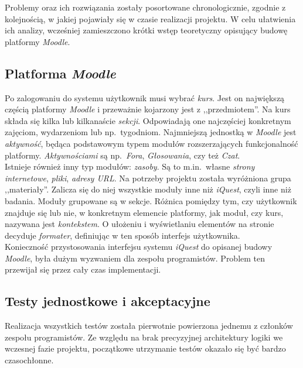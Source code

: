 Problemy oraz ich rozwiązania zostały posortowane chronologicznie, zgodnie z kolejnością, w jakiej pojawiały się w czasie realizacji projektu. W celu ułatwienia ich analizy, wcześniej zamieszczono krótki wstęp teoretyczny opisujący budowę platformy \textit{Moodle}.

\subsection{Platforma \textit{Moodle}}
\label{Chapter622}

Po zalogowaniu do systemu użytkownik musi wybrać \textit{kurs}. Jest on największą częścią platformy \textit{Moodle} i przeważnie kojarzony jest z ,,przedmiotem''. Na kurs składa się kilka lub kilkanaście \textit{sekcji}. Odpowiadają one najczęściej konkretnym zajęciom, wydarzeniom lub np.~tygodniom. Najmniejszą jednostką w \textit{Moodle} jest \textit{aktywność}, będąca podstawowym typem modułów rozszerzających funkcjonalność platformy. \textit{Aktywnościami} są np.~\textit{Fora}, \textit{Głosowania}, czy też \textit{Czat}. \\

Istnieje również inny typ modułów: \textit{zasoby}. Są to m.in.~własne \textit{strony internetowe}, \textit{pliki}, \textit{adresy URL}. Na potrzeby projektu została wyróżniona grupa ,,materiały''. Zalicza się do niej wszystkie moduły inne niż \textit{iQuest}, czyli inne niż badania. Moduły grupowane są w sekcje. Różnica pomiędzy tym, czy użytkownik znajduje się lub nie, w konkretnym elemencie platformy, jak moduł, czy kurs, nazywana jest \textit{kontekstem}. O ułożeniu i wyświetlaniu elementów na stronie decyduje \textit{formater}, definiując w ten sposób interfejs użytkownika. \\

Konieczność przystosowania interfejsu systemu \textit{iQuest} do opisanej budowy \textit{Moodle}, była dużym wyzwaniem dla zespołu programistów. Problem ten przewijał się przez cały czas implementacji.




\subsection{Testy jednostkowe i akceptacyjne}
\label{Chapter62b}

Realizacja wszystkich testów została pierwotnie powierzona jednemu z członków zespołu programistów. Ze względu na brak precyzyjnej architektury logiki we wczesnej fazie projektu, początkowe utrzymanie testów okazało się być bardzo czasochłonne. \\

